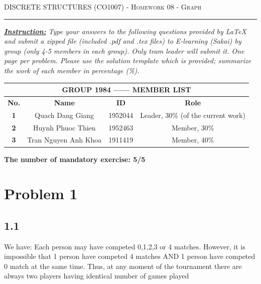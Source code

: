 \documentclass{article}
\begin{document}
\pagestyle{plain}
{\scshape } \hfill {\scshape DISCRETE STRUCTURES (CO1007) - Homework 08 - Graph} \hfill {\scshape }
 
\smallskip

\hrule

\bigskip
\textbf{\underline {\textit{Instruction:}}}
\textit{Type your answers to the following questions provided by LaTeX and submit a zipped file
(included .pdf and .tex files) to E-learning (Sakai) by group (only 4-5 members in each group). Only team
leader will submit it. One page per problem. Please use the solution template which is provided; summarize
the work of each member in percentage (\%).}

\bigskip
\begin{table}[h]
\begin{tabular}{|c|c|c|c|}
\hline
\multicolumn{4}{|c|}{\textbf{GROUP 1984 ------ MEMBER LIST}}        \\ \hline
\textbf{No.} & \textbf{Name}        & \textbf{ID} & \textbf{Role} \\ \hline
\textbf{1}   & Quach Dang Giang     & 1952044     & Leader, 30\% (of the current work)        \\ \hline
\textbf{2}   & Huynh Phuoc Thien    & 1952463     & Member, 30\%      \\ \hline
\textbf{3}   & Tran Nguyen Anh Khoa & 1911419     & Member, 40\%        \\ \hline
\end{tabular}
\end{table}
\bigskip

\textbf{The number of mandatory exercise: 5/5}  

\bigskip
\section*{Problem 1 }
\subsection*{1.1}
We have: Each person may have competed 0,1,2,3 or 4 matches. However, it is impossible that 1 person have competed 4 matches AND 1 person have competed 0 match at the same time. Thus, at any moment of the tournament there are always two players having identical number of games played
\end{document}
